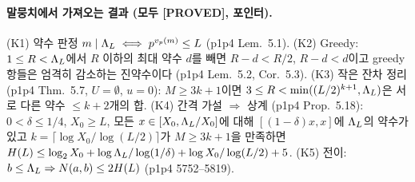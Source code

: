 \paragraph{말뭉치에서 가져오는 결과 (모두 [PROVED], 포인터).}
(K1) 약수 판정 $m\mid\Lambda_L\iff p^{v_p(m)}\le L$ (p1p4 Lem.~5.1).
(K2) Greedy: $1\le R<\Lambda_L$에서 $R$ 이하의 최대 약수 $d$를 빼면 $R-d<R/2$, $R-d<d$이고
greedy 항들은 엄격히 감소하는 진약수이다 (p1p4 Lem.~5.2, Cor.~5.3).
(K3) 작은 잔차 정리 (p1p4 Thm.~5.7, $U=\emptyset$, $u=0$): $M\ge 3k+1$이면 $3\le R<\min((L/2)^{k+1},\Lambda_L)$은
서로 다른 약수 $\le k+2$개의 합.
(K4) 간격 가설 $\Rightarrow$ 상계 (p1p4 Prop.~5.18): $0<\delta\le 1/4$, $X_0\ge L$, 모든 $x\in[X_0,\Lambda_L/X_0]$에
대해 $[(1-\delta)x,x]$에 $\Lambda_L$의 약수가 있고 $k=\lceil\log X_0/\log(L/2)\rceil$가 $M\ge 3k+1$을 만족하면
$H(L)\le \log_2X_0+\log\Lambda_L/\log(1/\delta)+\log X_0/\log(L/2)+5$.
(K5) 전이: $b\le\Lambda_L\Rightarrow N(a,b)\le 2H(L)$ (p1p4 5752--5819).

